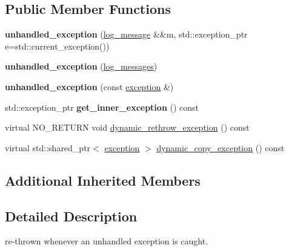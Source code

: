 \subsection*{Public Member Functions}
\begin{DoxyCompactItemize}
\item 
\mbox{\label{classfc_1_1unhandled__exception_a1f9c263f19732a3cbe153e98c5b8a9d3}} 
{\bfseries unhandled\+\_\+exception} (\mbox{\hyperlink{classfc_1_1log__message}{log\+\_\+message}} \&\&m, std\+::exception\+\_\+ptr e=std\+::current\+\_\+exception())
\item 
\mbox{\label{classfc_1_1unhandled__exception_ac274c1f499e26a47b759a8356636b296}} 
{\bfseries unhandled\+\_\+exception} (\mbox{\hyperlink{classstd_1_1vector}{log\+\_\+messages}})
\item 
\mbox{\label{classfc_1_1unhandled__exception_a819e457fd9bd6f9d941133d6527758d0}} 
{\bfseries unhandled\+\_\+exception} (const \mbox{\hyperlink{classfc_1_1exception}{exception}} \&)
\item 
\mbox{\label{classfc_1_1unhandled__exception_a85c226973a5ba415554b39b5082c1a77}} 
std\+::exception\+\_\+ptr {\bfseries get\+\_\+inner\+\_\+exception} () const
\item 
virtual N\+O\+\_\+\+R\+E\+T\+U\+RN void \mbox{\hyperlink{classfc_1_1unhandled__exception_a8177e0f7154591583154cf4e4ccf0c9e}{dynamic\+\_\+rethrow\+\_\+exception}} () const
\item 
virtual std\+::shared\+\_\+ptr$<$ \mbox{\hyperlink{classfc_1_1exception}{exception}} $>$ \mbox{\hyperlink{classfc_1_1unhandled__exception_a7946c956fb83ac7167173be9fdcac3e8}{dynamic\+\_\+copy\+\_\+exception}} () const
\end{DoxyCompactItemize}
\subsection*{Additional Inherited Members}


\subsection{Detailed Description}
re-\/thrown whenever an unhandled exception is caught.

